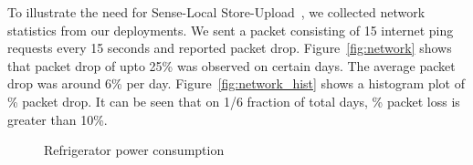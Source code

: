 \documentclass[10pt]{sensys-proc}
\newcommand{\figref}[1]{Figure~\ref{#1}}
\newcommand{\paradigms}{Sense-Local Store-Upload~}
\begin{document}
\noindent To illustrate the need for \paradigms, we collected network statistics from our deployments. We sent a packet consisting of 15 internet ping requests every 15 seconds and reported packet drop. \figref{fig:network} shows that packet drop of upto 25\% was observed on certain days. The average packet drop was around 6\% per day. \figref{fig:network_hist} shows a histogram plot of \% packet drop. It can be seen that on 1/6 fraction of total days, \% packet loss is greater than 10\%.


\begin{figure}
       
   
    \caption{Refrigerator power consumption}
\vspace{-6mm}
    \label{fig:metadata}

\end{figure}
	
\end{document}
